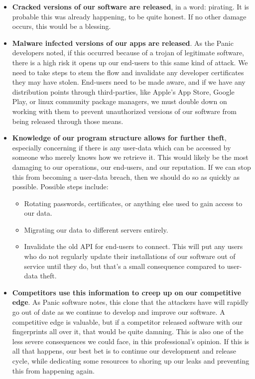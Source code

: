 \begin{itemize}
\item
  \textbf{Cracked versions of our software are released}, in a word:
  pirating. It is probable this was already happening, to be quite
  honest. If no other damage occurs, this would be a blessing.
\item
  \textbf{Malware infected versions of our apps are released}. As the
  Panic developers noted, if this occurred because of a trojan of
  legitimate software, there is a high risk it opens up our end-users to
  this same kind of attack. We need to take steps to stem the flow and
  invalidate any developer certificates they may have stolen. End-users
  need to be made aware, and if we have any distribution points through
  third-parties, like Apple's App Store, Google Play, or linux community
  package managers, we must double down on working with them to prevent
  unauthorized versions of our software from being released through
  those means.
\item
  \textbf{Knowledge of our program structure allows for further theft},
  especially concerning if there is any user-data which can be accessed
  by someone who merely knows how we retrieve it. This would likely be
  the most damaging to our operations, our end-users, and our
  reputation. If we can stop this from becoming a user-data breach, then
  we should do so as quickly as possible. Possible steps include:

  \begin{itemize}
  \item
    Rotating passwords, certificates, or anything else used to gain
    access to our data.
  \item
    Migrating our data to different servers entirely.
  \item
    Invalidate the old API for end-users to connect. This will put any
    users who do not regularly update their installations of our
    software out of service until they do, but that's a small
    consequence compared to user-data theft.
  \end{itemize}
\item
  \textbf{Competitors use this information to creep up on our
  competitive edge}. As Panic software notes, this clone that the
  attackers have will rapidly go out of date as we continue to develop
  and improve our software. A competitive edge is valuable, but if a
  competitor released software with our fingerprints all over it, that
  would be quite damning. This is also one of the less severe
  consequences we could face, in this professional's opinion. If this is
  all that happens, our best bet is to continue our development and
  release cycle, while dedicating some resources to shoring up our leaks
  and preventing this from happening again.
\end{itemize}

